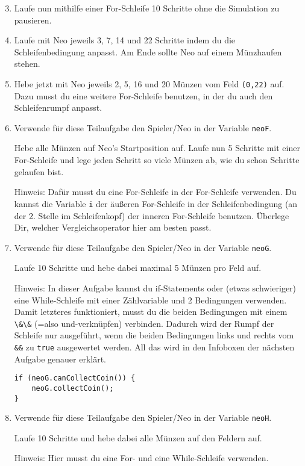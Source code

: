 \begin{enumerate}\setcounter{enumi}{2}
	\item
		Laufe nun mithilfe einer For-Schleife 10 Schritte ohne die Simulation zu pausieren.

	\item
		Laufe mit Neo jeweils 3, 7, 14 und 22 Schritte indem du die Schleifenbedingung anpasst.
		Am Ende sollte Neo auf einem Münzhaufen stehen.

	\item
		Hebe jetzt mit Neo jeweils 2, 5, 16 und 20 Münzen vom Feld \texttt{(0,22)} auf.
		Dazu musst du eine weitere For-Schleife benutzen, in der du auch den Schleifenrumpf anpasst.

	\item
		Verwende für diese Teilaufgabe den Spieler/Neo in der Variable \lstinline{neoF}.

		Hebe alle Münzen auf Neo's Startposition auf.
		Laufe nun 5 Schritte mit einer For-Schleife und lege jeden Schritt so viele Münzen ab, wie du schon Schritte gelaufen bist.

		Hinweis: Dafür musst du eine For-Schleife in der For-Schleife verwenden.
		Du kannst die Variable \lstinline{i} der äußeren For-Schleife in der Schleifenbedingung (an der 2. Stelle im Schleifenkopf) der inneren For-Schleife benutzen.
		Überlege Dir, welcher Vergleichsoperator hier am besten passt.

	\item
		Verwende für diese Teilaufgabe den Spieler/Neo in der Variable \lstinline{neoG}.

		Laufe 10 Schritte und hebe dabei maximal 5 Münzen pro Feld auf.

		Hinweis: In dieser Aufgabe kannst du if-Statements oder (etwas schwieriger) eine While-Schleife mit einer Zählvariable und 2 Bedingungen verwenden.
		Damit letzteres funktioniert, musst du die beiden Bedingungen mit einem \lstinline{\&\&} (=also und-verknüpfen) verbinden.
		Dadurch wird der Rumpf der Schleife nur ausgeführt, wenn die beiden Bedingungen links und rechts vom \lstinline{&&} zu \lstinline{true} ausgewertet werden.
		All das wird in den Infoboxen der nächsten Aufgabe genauer erklärt.

		\begin{lstlisting}
if (neoG.canCollectCoin()) {
    neoG.collectCoin();
}
		\end{lstlisting}

	\item
		Verwende für diese Teilaufgabe den Spieler/Neo in der Variable \lstinline{neoH}.

		Laufe 10 Schritte und hebe dabei alle Münzen auf den Feldern auf.

		Hinweis: Hier musst du eine For- und eine While-Schleife verwenden.
\end{enumerate}
\newpage

